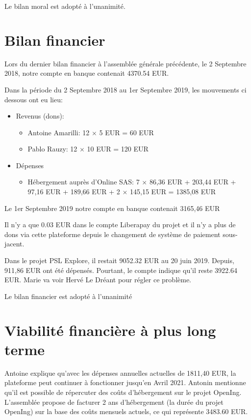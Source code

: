\documentclass[a4paper]{article}
\begin{document}
Le bilan moral est adopté à l'unanimité.

\section{Bilan financier}

Lors du dernier bilan financier à l'assemblée générale précédente, le 2 Septembre 2018, notre compte en banque contenait 4370.54 EUR.

Dans la période du 2 Septembre 2018 au 1er Septembre 2019, les mouvements ci dessous ont eu lieu:

\begin{itemize}
  \item Revenus (dons):
    \begin{itemize}
      \item Antoine Amarilli: 12 $\times$ 5 EUR = 60 EUR
      \item Pablo Rauzy: 12 $\times$ 10 EUR = 120 EUR
    \end{itemize}
   \item Dépenses
     \begin{itemize}
       \item Hébergement auprès d'Online SAS:  7 $\times$ 86,36 EUR + 203,44 EUR + 97,16 EUR + 189,66 EUR + 2 $\times$ 145,15 EUR = 1385,08 EUR
     \end{itemize}
\end{itemize}
    
Le 1er Septembre 2019 notre compte en banque contenait 3165,46 EUR

Il n'y a que 0.03 EUR dans le compte Liberapay du projet et il n'y a plus de dons
via cette plateforme depuis le changement de système de paiement sous-jacent.

Dans le projet PSL Explore, il restait 9052.32 EUR au 20 juin 2019. Depuis, 911,86 EUR ont été dépensés. Pourtant, le compte indique qu'il reste 3922.64 EUR. Marie va voir Hervé Le Dréant pour régler ce problème.

Le bilan financier est adopté à l'unanimité

\section{Viabilité financière à plus long terme}

Antoine explique qu'avec les dépenses annuelles actuelles de 1811,40 EUR, la plateforme peut continuer à fonctionner jusqu'en Avril 2021.
Antonin mentionne qu'il est possible de répercuter des coûts d'hébergement sur le projet OpenIng. L'assemblée propose de facturer 2 ans d'hébergement (la durée du projet OpenIng) sur la base des coûts mensuels actuels, ce qui représente 3483.60 EUR.
\end{document}
